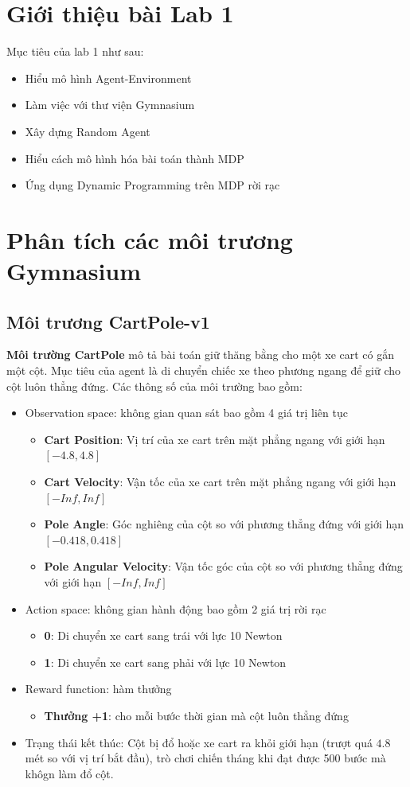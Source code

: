 \section{Giới thiệu bài Lab 1}
Mục tiêu của lab 1 như sau:
\begin{itemize}
    \item Hiểu mô hình Agent-Environment
    \item Làm việc với thư viện Gymnasium
    \item Xây dựng Random Agent
    \item Hiểu cách mô hình hóa bài toán thành MDP
    \item Ứng dụng Dynamic Programming trên MDP rời rạc 
\end{itemize}

\section{Phân tích các môi trương Gymnasium}
\subsection{Môi trương CartPole-v1}
\textbf{Môi trường CartPole} mô tả bài toán giữ thăng bằng cho một xe cart có gắn một cột. Mục tiêu của agent là di chuyển chiếc xe theo phương ngang để giữ cho cột luôn thẳng đứng. 
Các thông số của môi trường bao gồm:
\begin{itemize}
    \item Observation space: không gian quan sát bao gồm 4 giá trị liên tục
    \begin{itemize}
        \item \textbf{Cart Position}: Vị trí của xe cart trên mặt phẳng ngang với giới hạn $[-4.8, 4.8]$
        \item \textbf{Cart Velocity}: Vận tốc của xe cart trên mặt phẳng ngang với giới hạn $[-Inf, Inf]$
        \item \textbf{Pole Angle}: Góc nghiêng của cột so với phương thẳng đứng với giới hạn $[-0.418, 0.418]$
        \item \textbf{Pole Angular Velocity}: Vận tốc góc của cột so với phương thẳng đứng với giới hạn $[-Inf, Inf]$
    \end{itemize}
    \item Action space: không gian hành động bao gồm 2 giá trị rời rạc
    \begin{itemize}
        \item \textbf{0}: Di chuyển xe cart sang trái với lực 10 Newton
        \item \textbf{1}: Di chuyển xe cart sang phải với lực 10 Newton
    \end{itemize}
    \item Reward function: hàm thưởng
    \begin{itemize}
        \item \textbf{Thưởng +1}: cho mỗi bước thời gian mà cột luôn thẳng đứng
    \end{itemize}
    \item Trạng thái kết thúc: Cột bị đổ hoặc xe cart ra khỏi giới hạn (trượt quá $4.8$ mét so với vị trí bắt đầu), trò chơi chiến tháng khi đạt được 500 bước mà khôgn làm đổ cột.
\end{itemize}

